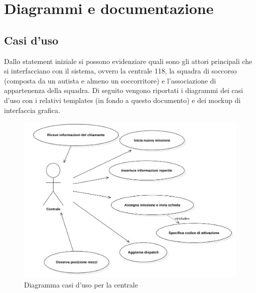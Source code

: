 \documentclass{article}
\begin{document}
    \section{Diagrammi e documentazione}
    \subsection{Casi d'uso}
    Dallo statement iniziale si possono evidenziare quali sono gli attori principali che si interfacciano con il sistema, ovvero la centrale 118, la squadra di soccorso (composta da un autista e almeno un soccorritore) e l'associazione di appartenenza della squadra.
    Di seguito vengono riportati i diagrammi dei casi d'uso con i relativi templates (in fondo a questo documento) e dei mockup di interfaccia grafica.

    \begin{figure}[!h]
        \centering
        \includegraphics[width=5.5in]{diagrams/png/uc-centrale.png}
        \caption{Diagramma casi d'uso per la centrale}
        \label{fig:uc-controlcenter}
    \end{figure}
\end{document}
